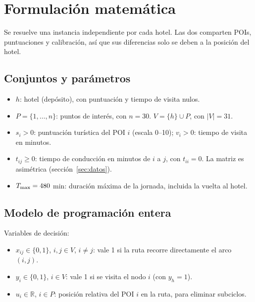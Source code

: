 \section{Formulación matemática}
\label{sec:formulacion}

Se resuelve una instancia independiente por cada hotel. Las dos comparten POIs, puntuaciones y calibración, así que sus diferencias solo se deben a la posición del hotel.

\subsection{Conjuntos y parámetros}

\begin{itemize}
  \item $h$: hotel (depósito), con puntuación y tiempo de visita nulos.
  \item $P = \{1,\dots,n\}$: puntos de interés, con $n = 30$. $V = \{h\} \cup P$, con $|V| = 31$.
  \item $s_i > 0$: puntuación turística del POI $i$ (escala 0--10); $v_i > 0$: tiempo de visita en minutos.
  \item $t_{ij} \ge 0$: tiempo de conducción en minutos de $i$ a $j$, con $t_{ii} = 0$. La matriz es asimétrica (sección~\ref{sec:datos}).
  \item $T_{\max} = 480$ min: duración máxima de la jornada, incluida la vuelta al hotel.
\end{itemize}

\subsection{Modelo de programación entera}

Variables de decisión:
\begin{itemize}
  \item $x_{ij} \in \{0,1\}$, $i,j \in V$, $i \ne j$: vale 1 si la ruta recorre directamente el arco $(i,j)$.
  \item $y_i \in \{0,1\}$, $i \in V$: vale 1 si se visita el nodo $i$ (con $y_h = 1$).
  \item $u_i \in \mathbb{R}$, $i \in P$: posición relativa del POI $i$ en la ruta, para eliminar subciclos.
\end{itemize}

